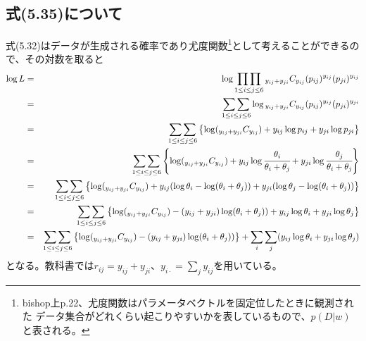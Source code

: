 \documentclass[10pt, a4paper]{ltjsarticle}
\begin{document}
\subsection{式(5.35)について}
式(5.32)はデータが生成される確率であり尤度関数\footnote{bishop上p.22、尤度関数はパラメータベクトルを固定位したときに観測された
データ集合がどれくらい起こりやすいかを表しているもので、$p(D|w)$と表される。}として考えることができるので、その対数を取ると
\begin{eqnarray}
  \log L &=& \log\mathop{\prod\prod}_{1\leq i \leq j \leq 6} {}_{y_{ij}+y_{ji}}C_{y_{ij}}(p_{ij})^{y_{ij}}(p_{ji})^{y_{ij}} \\
  &=& \mathop{\sum\sum}_{1\leq i \leq j \leq 6} \log {}_{y_{ij}+y_{ji}}C_{y_{ij}}(p_{ij})^{y_{ij}}(p_{ji})^{y_{ji}} \\
  &=& \mathop{\sum\sum}_{1\leq i \leq j \leq 6} 
    \left\{ \log({}_{y_{ij}+y_{ji}}C_{y_{ij}}) + y_{ij}\log p_{ij} + y_{ji}\log p_{ji} \right\} \\
  &=& \mathop{\sum\sum}_{1\leq i \leq j \leq 6} 
    \left\{ \log({}_{y_{ij}+y_{ji}}C_{y_{ij}}) + y_{ij}\log \cfrac{\theta_i}{\theta_i+\theta_j} + y_{ji}\log \cfrac{\theta_j}{\theta_i+\theta_j} \right\} \\
  &=& \mathop{\sum\sum}_{1\leq i \leq j \leq 6} 
    \left\{ \log({}_{y_{ij}+y_{ji}}C_{y_{ij}}) + y_{ij}(\log\theta_i - \log(\theta_i+\theta_j)) + y_{ji}(\log\theta_j - \log(\theta_i+\theta_j)) \right\} \\
  &=& \mathop{\sum\sum}_{1\leq i \leq j \leq 6} 
    \left\{ \log({}_{y_{ij}+y_{ji}}C_{y_{ij}}) -(y_{ij}+y_{ji})\log(\theta_i+\theta_j)) + y_{ij}\log\theta_i + y_{ji}\log\theta_j \right\} \\
  &=& \mathop{\sum\sum}_{1\leq i \leq j \leq 6} 
    \left\{ \log({}_{y_{ij}+y_{ji}}C_{y_{ij}}) -(y_{ij}+y_{ji})\log(\theta_i+\theta_j))\right\} + \sum_i\sum_j(y_{ij}\log\theta_i + y_{ji}\log\theta_j ) \label{eq:5.35}
\end{eqnarray}
となる。教科書では$r_{ij}=y_{ij}+y_{ji}$、$y_{i\cdot}=\sum_j y_{ij}$を用いている。

\end{document}
